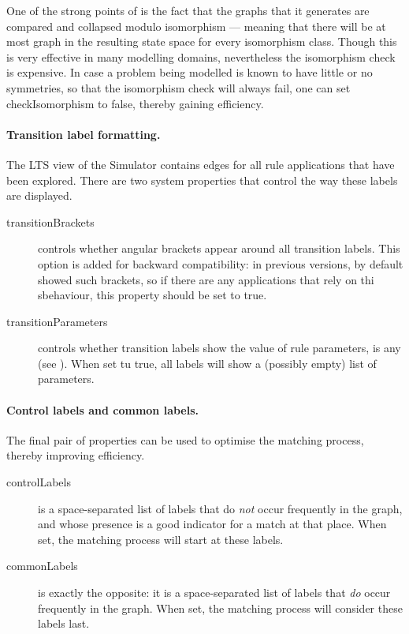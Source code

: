 One of the strong points of \Groove{} is the fact that the graphs that it
generates are compared and collapsed modulo isomorphism --- meaning that there
will be at most graph in the resulting state space for every isomorphism
class. Though this is very effective in many modelling domains, nevertheless
the isomorphism check is expensive. In case a problem being modelled is known
to have little or no symmetries, so that the isomorphism check will always
fail, one can set \textsf{checkIsomorphism} to \textsf{false}, thereby gaining
efficiency.

\paragraph{Transition label formatting.}

The LTS view of the Simulator contains edges for all rule applications that
have been explored. There are two system properties that control the way these
labels are displayed.
\begin{description}
\item[\textsf{transitionBrackets}] controls whether angular brackets appear
  around all transition labels. This option is added for backward
  compatibility: in previous versions, \Groove{} by default showed such
  brackets, so if there are any applications that rely on thi sbehaviour, this
  property should be set to \textsf{true}.

\item[\textsf{transitionParameters}] controls whether transition labels
  show the value of rule parameters, is any (see ). When set
  tu \textsf{true}, all labels will show a (possibly empty) list of
  parameters.
\end{description}

\paragraph{Control labels and common labels.}

The final pair of properties can be used to optimise the matching process,
thereby improving efficiency.
%
\begin{description}
\item[\textsf{controlLabels}] is a space-separated list of labels that do
  \emph{not} occur frequently in the graph, and whose presence is a good
  indicator for a match at that place. When set, the matching process will
  start at these labels.
\item[\textsf{commonLabels}] is exactly the opposite: it is a space-separated
  list of labels that \emph{do} occur frequently in the graph. When set, the
  matching process will consider these labels last.
\end{description}

